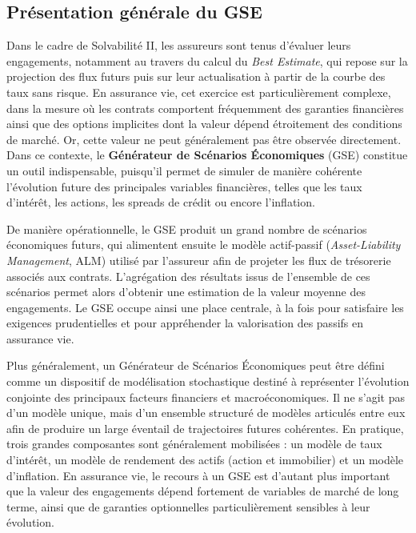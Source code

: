 \subsection{Présentation générale du GSE}

Dans le cadre de Solvabilité II, les assureurs sont tenus d'évaluer leurs engagements, notamment au travers du calcul du \textit{Best Estimate}, qui repose sur la projection des flux futurs puis sur leur actualisation à partir de la courbe des taux sans risque. En assurance vie, cet exercice est particulièrement complexe, dans la mesure où les contrats comportent fréquemment des garanties financières ainsi que des options implicites dont la valeur dépend étroitement des conditions de marché. Or, cette valeur ne peut généralement pas être observée directement. Dans ce contexte, le \textbf{Générateur de Scénarios Économiques} (GSE) constitue un outil indispensable, puisqu'il permet de simuler de manière cohérente l'évolution future des principales variables financières, telles que les taux d'intérêt, les actions, les spreads de crédit ou encore l'inflation.

De manière opérationnelle, le GSE produit un grand nombre de scénarios économiques futurs, qui alimentent ensuite le modèle actif-passif (\textit{Asset-Liability Management}, ALM) utilisé par l'assureur afin de projeter les flux de trésorerie associés aux contrats. L'agrégation des résultats issus de l'ensemble de ces scénarios permet alors d'obtenir une estimation de la valeur moyenne des engagements. Le GSE occupe ainsi une place centrale, à la fois pour satisfaire les exigences prudentielles et pour appréhender la valorisation des passifs en assurance vie.

Plus généralement, un Générateur de Scénarios Économiques peut être défini comme un dispositif de modélisation stochastique destiné à représenter l'évolution conjointe des principaux facteurs financiers et macroéconomiques. Il ne s'agit pas d'un modèle unique, mais d'un ensemble structuré de modèles articulés entre eux afin de produire un large éventail de trajectoires futures cohérentes. En pratique, trois grandes composantes sont généralement mobilisées : un modèle de taux d'intérêt, un modèle de rendement des actifs (action et immobilier) et un modèle d'inflation. En assurance vie, le recours à un GSE est d'autant plus important que la valeur des engagements dépend fortement de variables de marché de long terme, ainsi que de garanties optionnelles particulièrement sensibles à leur évolution.

